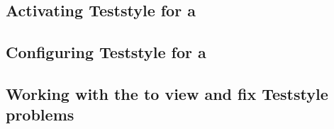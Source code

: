 

\subsection{Activating Teststyle for a \gdproject{}}
\label{TeststyleActivate}


\subsection{Configuring Teststyle for a \gdproject{}}
\label{TeststyleConfigure}


\subsection{Working with the \gdprobview{} to view and fix Teststyle problems}
\label{TeststyleProbView}




